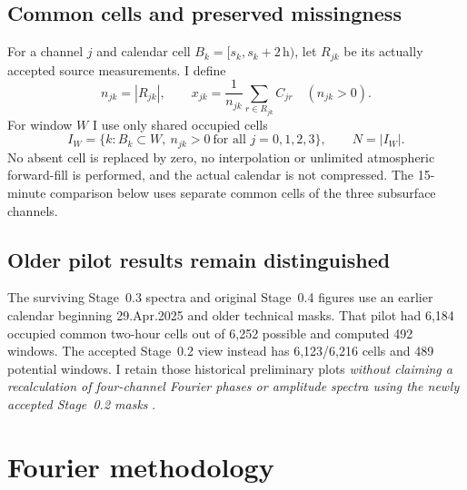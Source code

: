 \documentclass[11pt,letterpaper]{article}
\begin{document}
\subsection{Common cells and preserved missingness}
For a channel $j$ and calendar cell
$B_k=[s_k,s_k+2\,\mathrm{h})$, let $R_{jk}$
be its actually accepted source measurements.
I define
\begin{equation}
n_{jk}=|R_{jk}|,\qquad
x_{jk}=\frac1{n_{jk}}\sum_{r\in R_{jk}}C_{jr}
\quad(n_{jk}>0).
\label{eq:bin}
\end{equation}
For window $W$ I use only shared occupied cells
\begin{equation}
I_W=\{k:B_k\subset W,\ n_{jk}>0\
\text{for all }j=0,1,2,3\},\qquad N=|I_W|.
\label{eq:common}
\end{equation}
No absent cell is replaced by zero, no interpolation
or unlimited atmospheric forward-fill is performed,
and the actual calendar is not compressed. The
15-minute comparison below uses separate common
cells of the three subsurface channels.

\subsection{Older pilot results remain distinguished}
The surviving Stage~0.3 spectra and original
Stage~0.4 figures use an earlier calendar beginning
29.Apr.2025 and older technical masks. That pilot
had 6,184 occupied common two-hour cells out of
6,252 possible and computed 492 windows.
The accepted Stage~0.2 view instead has
6,123/6,216 cells and 489 potential windows.
I retain those historical preliminary plots
\emph{without claiming a recalculation of four-channel
Fourier phases or amplitude spectra using the newly
accepted Stage~0.2 masks} \cite{spectra,passport,validation,stage02}.

\section{Fourier methodology}
\end{document}
